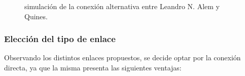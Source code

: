 \documentclass[11pt,a4paper]{article}
\begin{document}
\begin{figure}[ht!]
  \centering
  \quad
  \quad
  \caption{simulación de la conexión alternativa entre Leandro N. Alem y Quines.}
  \label{fig:sim_alt2}
\end{figure}
\clearpage
\subsubsection{Elección del tipo de enlace}
Observando los distintos enlaces propuestos, se decide optar por la conexión directa, ya que la misma presenta las siguientes ventajas:
\end{document}
